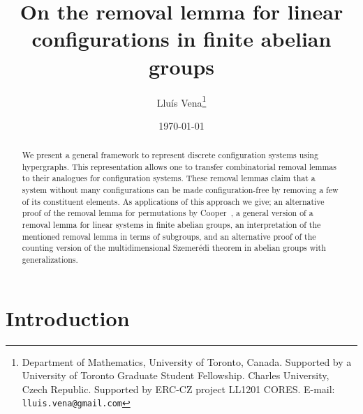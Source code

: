 \documentclass[10pt]{article}
\begin{document}
\title{On the removal lemma for linear configurations in finite abelian groups}
\author{Llu\'{i}s Vena\thanks{Department of Mathematics, University of Toronto, Canada. \newline Supported by a University of Toronto Graduate Student Fellowship.
\newline Charles University, Czech Republic. \newline Supported by ERC-CZ project LL1201 CORES. \newline E-mail: {\tt lluis.vena@gmail.com}}}%
\date{\today}


\maketitle




\begin{abstract}
We present a general framework to represent discrete configuration systems using hypergraphs. This representation allows one to transfer combinatorial removal lemmas to their analogues for configuration systems. These removal lemmas claim that a system without many configurations can be made configuration-free by removing a few of its constituent elements. As applications of this approach we give; an alternative proof of the removal lemma for permutations by Cooper~\cite{cooper06}, a general version of a removal lemma for linear systems in finite abelian groups, an interpretation of the mentioned removal lemma in terms of subgroups, and an alternative proof of the counting version of the multidimensional Szemer\'edi theorem in abelian groups with generalizations.
\end{abstract}






\section{Introduction} \label{s.intro}
\end{document}
